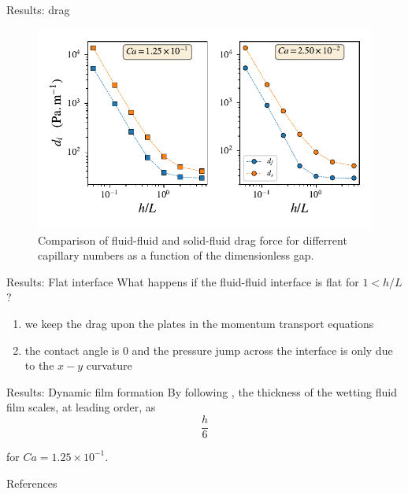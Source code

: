 \documentclass[presentation]{beamer}
\begin{document}
\begin{frame}[label={sec:orgbc5cfbd}]{Results: drag}
\begin{figure}
\centering
\includegraphics[scale=0.8]{RESULTS_dragSepare.pdf}
\caption{Comparison of fluid-fluid and solid-fluid drag force for differrent capillary numbers as a
function of the dimensionless gap.}
\end{figure}
\end{frame}

\begin{frame}[label={sec:orgab07557}]{Results: Flat interface}
What happens if the fluid-fluid interface is flat for \(1<h/L\)?

\begin{enumerate}
	\item we keep the drag upon the plates in the momentum transport equations
	\item the contact angle is 0 and the pressure jump across the interface is only due to the $x-y$ curvature
\end{enumerate}
\end{frame}

\begin{frame}[label={sec:org497bd82}]{Results: Dynamic film formation}
By following \cite{park1984two}, the thickness of the wetting fluid film
scales, at leading order, as 
\begin{equation}
\frac{h}{6}
\end{equation}

for \(Ca= 1.25 \times 10^{-1}\).
\end{frame}

\begin{frame}[label={sec:org00a4ea3}]{References}


\end{frame}
\end{document}
